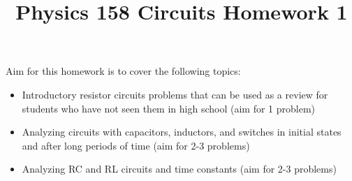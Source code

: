 \documentclass[11pt, fleqn]{article}
\title{Physics 158 Circuits Homework 1}
\author{}
\date{}
\begin{document}
\allowdisplaybreaks

\maketitle


Aim for this homework is to cover the following topics:
\begin{itemize}
    \item Introductory resistor circuits problems that can be used as a review for students who have not seen them in high school (aim for 1 problem)
    \item Analyzing circuits with capacitors, inductors, and switches in initial states and after long periods of time (aim for 2-3 problems)
    \item Analyzing RC and RL circuits and time constants (aim for 2-3 problems)
\end{itemize}
\end{document}
